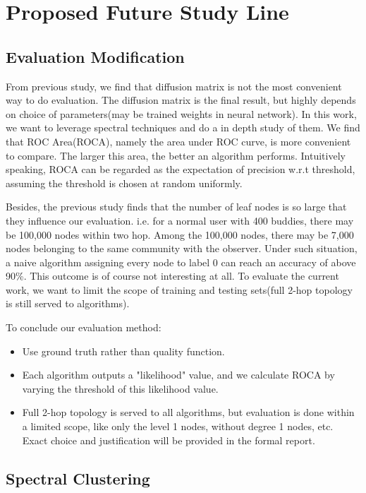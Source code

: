 \documentclass[11pt,a4paper]{article}
\begin{document}
\section{Proposed Future Study Line}

\subsection{Evaluation Modification}

From previous study, we find that diffusion matrix is not the most 
convenient way to do evaluation. The diffusion matrix is the final 
result, but highly depends on choice of parameters(may be trained 
weights in neural network). In this work, we want to leverage 
spectral techniques and do a in depth study of them. We find that 
ROC Area(ROCA), namely the area under ROC curve, is more convenient 
to compare. The larger this area, the better an algorithm performs. 
Intuitively speaking, ROCA can be regarded as the expectation of
precision w.r.t threshold, assuming the threshold is chosen at random
uniformly. 

Besides, the previous study finds that the number of leaf nodes is 
so large that they influence our evaluation. i.e. for a normal user 
with 400 buddies, there may be 100,000 nodes within two hop. Among 
the 100,000 nodes, there may be 7,000 nodes belonging to the same 
community with the observer. Under such situation, a naive algorithm 
assigning every node to label 0 can reach an accuracy of above 90\%. 
This outcome is of course not interesting at all. To evaluate the 
current work, we want to limit the scope of training and testing 
sets(full 2-hop topology is still served to algorithms). 

To conclude our evaluation method: 
\begin{itemize}
	\item Use ground truth rather than quality function. 
	\item Each algorithm outputs a "likelihood" value, 
	and we calculate ROCA by varying the threshold of this 
	likelihood value. 
	\item Full 2-hop topology is served to all algorithms, 
	but evaluation is done within a limited scope, like 
	only the level 1 nodes, without degree 1 nodes, etc. 
	Exact choice and justification will be provided in 
	the formal report. 
\end{itemize}

\subsection{Spectral Clustering}
\end{document}
